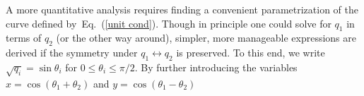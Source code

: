 \documentclass[aps,prl,twocolumn,showpacs]{revtex4}
\newcommand{\abs}[1]{\left|{#1}\right|}
\begin{document}
A more quantitative analysis requires finding a convenient parametrization of the curve defined by~Eq.~(\ref{unit cond}). Though in principle one could solve for $q_1$ in terms of $q_2$ (or the other way around), simpler, more manageable expressions are derived if the symmetry under $q_1\leftrightarrow q_2$ is preserved. To this end, we write $\sqrt{q_i} = \sin \theta_i$ for $0\leq \theta_i \leq \pi/2$. By further introducing the variables $x =\cos(\theta_1+\theta_2)$ and $y = \cos (\theta_1 - \theta_2)$
%
%
%
%
\end{document}
